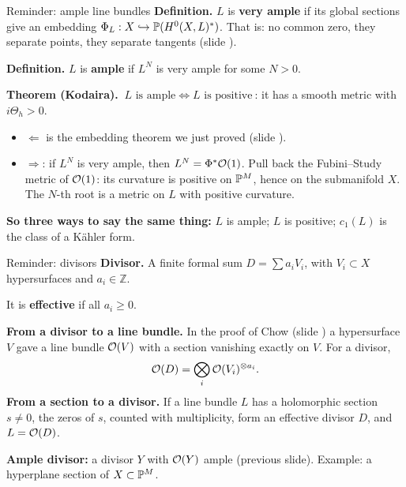 \begin{frame}{Reminder: ample line bundles}
\label{fr:kv-ample}
\textbf{Definition.} \(L\) is \textbf{very ample} if its global sections give an embedding \(\Phi_L:X\hookrightarrow\mathbb P(H^0(X,L)^*)\). That is: no common zero, they separate points, they separate tangents (slide \hyperlink{fr:goal-sections}{\pageref{fr:goal-sections}}).
\par\medskip
\textbf{Definition.} \(L\) is \textbf{ample} if \(L^N\) is very ample for some \(N>0\).
\par\medskip
\textbf{Theorem (Kodaira).} \(\ \boxed{L \text{ is ample}\iff L \text{ is positive}}\ \): it has a smooth metric with \(i\Theta_h>0\).
\begin{itemize}
\setlength{\itemsep}{5pt}
\item \(\Leftarrow\) is the embedding theorem we just proved (slide \hyperlink{fr:conclusion}{\pageref{fr:conclusion}}).
\item \(\Rightarrow\): if \(L^N\) is very ample, then \(L^N=\Phi^*\mathcal O(1)\). Pull back the Fubini--Study metric of \(\mathcal O(1)\): its curvature is positive on \(\mathbb P^M\), hence on the submanifold \(X\). The \(N\)-th root is a metric on \(L\) with positive curvature.
\end{itemize}
\par\medskip
\textbf{So three ways to say the same thing:} \(L\) is ample; \(L\) is positive; \(c_1(L)\) is the class of a Kähler form.
\end{frame}

\begin{frame}{Reminder: divisors}
\label{fr:kv-divisors}
\textbf{Divisor.} A finite formal sum \(D=\sum a_iV_i\), with \(V_i\subset X\) hypersurfaces and \(a_i\in\mathbb Z\).
\par\smallskip
It is \textbf{effective} if all \(a_i\ge0\).
\par\bigskip
\textbf{From a divisor to a line bundle.} In the proof of Chow (slide \hyperlink{fr:chow-3}{\pageref{fr:chow-3}}) a hypersurface \(V\) gave a line bundle \(\mathcal O(V)\) with a section vanishing exactly on \(V\). For a divisor,
\[
\mathcal O(D)=\bigotimes_i\mathcal O(V_i)^{\otimes a_i} .
\]
\textbf{From a section to a divisor.} If a line bundle \(L\) has a holomorphic section \(s\ne0\), the zeros of \(s\), counted with multiplicity, form an effective divisor \(D\), and \(L=\mathcal O(D)\).
\par\bigskip
\textbf{Ample divisor:} a divisor \(Y\) with \(\mathcal O(Y)\) ample (previous slide). Example: a hyperplane section of \(X\subset\mathbb P^M\).
\end{frame}


